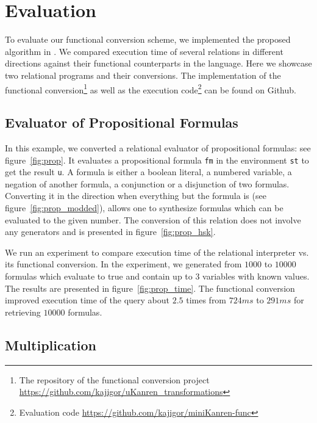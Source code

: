 \section{Evaluation}

To evaluate our functional conversion scheme, we implemented the proposed algorithm in \haskell.
We compared execution time of several relations in different directions against their functional counterparts in the \ocaml language.
Here we showcase two relational programs and their conversions.
The implementation of the functional conversion\footnote{The repository of the functional conversion project \url{https://github.com/kajigor/uKanren_transformations}} as well as the execution code\footnote{Evaluation code \url{https://github.com/kajigor/miniKanren-func}} can be found on Github.



\subsection{Evaluator of Propositional Formulas}

In this example, we converted a relational evaluator of propositional formulas: see figure~\ref{fig:prop}.
It evaluates a propositional formula \lstinline{fm} in the environment \lstinline{st} to get the result \lstinline{u}.
A formula is either a boolean literal, a numbered variable, a negation of another formula, a conjunction or a disjunction of two formulas.
Converting it in the direction when everything but the formula is \inm (see figure~\ref{fig:prop_modded}), allows one to synthesize formulas which can be evaluated to the given number.
The conversion of this relation does not involve any generators and is presented in figure~\ref{fig:prop_hsk}.

We run an experiment to compare execution time of the relational interpreter vs. its functional conversion.
In the experiment, we generated from $1000$ to $10000$ formulas which evaluate to true and contain up to $3$ variables with known values.
The results are presented in figure~\ref{fig:prop_time}.
The functional conversion improved execution time of the query about $2.5$ times from $724ms$ to $291ms$ for retrieving $10000$ formulas.

 



\subsection{Multiplication}

